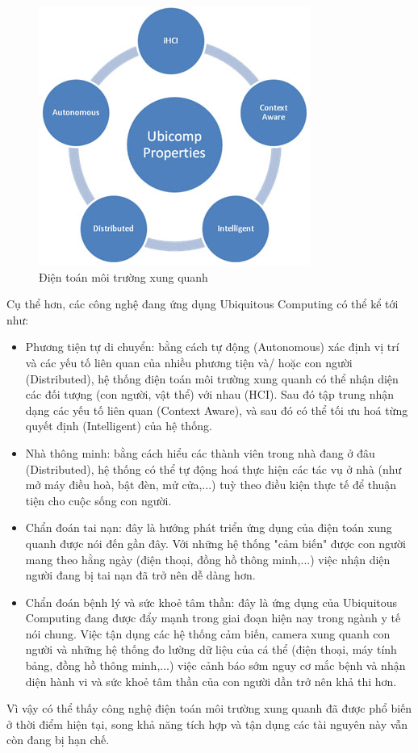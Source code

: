 \begin{figure}[ht]
    \centering
    \includegraphics[width=0.5\linewidth]{Images/properties.jpg}
    \caption{ Điện toán môi trường xung quanh}
    \label{ubicomp}
\end{figure}

Cụ thể hơn, các công nghệ đang ứng dụng Ubiquitous Computing có thể kể tới như:
\begin{itemize}
    \item Phương tiện tự di chuyển: bằng cách tự động (Autonomous) xác định vị trí và các yếu tố liên quan của nhiều phương tiện và/ hoặc con người (Distributed), hệ thống điện toán môi trường xung quanh có thể nhận diện các đối tượng (con người, vật thể) với nhau (HCI). Sau đó tập trung nhận dạng các yếu tố liên quan (Context Aware), và sau đó có thể tối ưu hoá từng quyết định (Intelligent) của hệ thống.
    \item Nhà thông minh: bằng cách hiểu các thành viên trong nhà đang ở đâu (Distributed), hệ thống có thể tự động hoá thực hiện các tác vụ ở nhà (như mở máy điều hoà, bật đèn, mử cửa,...) tuỳ theo điều kiện thực tế để thuận tiện cho cuộc sống con người.
    \item Chẩn đoán tai nạn: đây là hướng phát triển ứng dụng của điện toán xung quanh được nói đến gần đây. Với những hệ thống "cảm biến" được con người mang theo hằng ngày (điện thoại, đồng hồ thông minh,...) việc nhận diện người đang bị tai nạn đã trở nên dễ dàng hơn.
    \item Chẩn đoán bệnh lý và sức khoẻ tâm thần: đây là ứng dụng của Ubiquitous Computing đang được đẩy mạnh trong giai đoạn hiện nay trong ngành y tế nói chung. Việc tận dụng các hệ thống cảm biến, camera xung quanh con người và những hệ thống đo lường dữ liệu của cá thể (điện thoại, máy tính bảng, đồng hồ thông minh,...) việc cảnh báo sớm nguy cơ mắc bệnh và nhận diện hành vi và sức khoẻ tâm thần của con người dần trở nên khả thi hơn.
\end{itemize}
Vì vậy có thể thấy công nghệ điện toán môi trường xung quanh đã được phổ biến ở thời điểm hiện tại, song khả năng tích hợp và tận dụng các tài nguyên này vẫn còn đang bị hạn chế.


